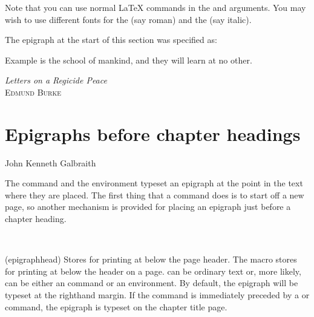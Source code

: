  Note that you can use normal LaTeX commands in the  and
  arguments. You may wish to use different fonts for the
  (say roman) and the  (say italic).

 The epigraph at the start of this section was specified as:
 \begin{lcode}
 \epigraph{Example is the school of mankind,
           and they will learn at no other.}
  {\textit{Letters on a Regicide Peace}\\ \textsc{Edmund Burke}}
 \end{lcode}

 \section{Epigraphs before chapter headings}

\begingroup
      {\textsf{John Kenneth Galbraith}}
\endgroup

    The \cmd{\epigraph} command and the  environment typeset
 an epigraph at the point in the text where they are placed. The
 first thing that a \cmd{\chapter} command does is to start off a new page,
 so another mechanism is provided for placing an epigraph just before
 a chapter heading.
    
\begin{syntax}
 \cmd{\epigraphhead} \\
\end{syntax}
\glossary(epigraphhead)%
  {}%
  {Stores  for printing at  below the page header.}
  The \cmd{\epigraphhead} macro  stores  
 for printing at  below the header on a page.
  can be ordinary text or, more likely, can be either an
 \cmd{\epigraph} command or an  environment. By default, the 
 epigraph will be typeset at the righthand margin.
 If the command is immediately preceded by a \cmd{\chapter} or \cmd{\chapter*} 
 command, the epigraph is typeset on the chapter title page.

